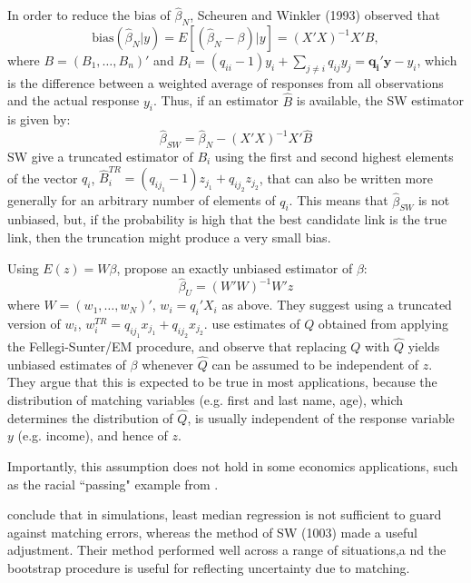 \documentclass[12pt]{article}
\begin{document}
In order to reduce the bias of $\hat{\beta}_N$, Scheuren and Winkler (1993) %
observed that 
$$\text{bias} (\hat{\beta}_N | y) = E[(\hat{\beta}_N - \beta) | y ] = (X'X)^{-1} X'B,$$ 
where $B = (B_1, \dots, B_n)'$ and $B_i = (q_{ii}-1)y_i + \sum_{j\neq i } q_{ij} y_j = \mathbf{q_i'y} - y_i$, which is the difference between a weighted average of responses from all observations and the actual response $y_i$.  Thus, if an estimator $\hat{B}$ is available, the SW estimator is given by:
$$ \hat{\beta}_{SW} = \hat{\beta}_N - (X'X)^{-1} X' \hat{B}$$ 
SW give a truncated estimator of $B_i$ using the first and second highest elements of the vector $q_i$, $\hat{B}_i^{TR} = (q_{ij_1} - 1) z_{j_1} + q_{ij_2} z_{j_2}$, that can also be written more generally for an arbitrary number of elements of $q_i$.  This means that $\hat{\beta}_{SW}$ is not unbiased, but, if the probability is high that the best candidate link is the true link, then the truncation might produce a very small bias. 

Using $E(z) = W\beta$, \cite{lahiri05} propose an exactly unbiased estimator of $\beta$:
$$ \hat{\beta}_U = (W'W)^{-1} W'z$$ 
where $W = (w_1, \dots, w_N)'$, $w_i = q_i'X_i$ as above.  They suggest using a truncated version of $w_i$, $w_i^{TR} = q_{ij_1} x_{j_1} + q_{ij_2} x_{j_2}$.   \cite{lahiri05} use estimates of $Q$ obtained from applying the Fellegi-Sunter/EM procedure, and observe that replacing $Q$ with $\hat{Q}$ yields unbiased estimates of $\beta$ whenever $\hat{Q}$ can be assumed to be independent of $z$.  They argue that this is expected to be true in most applications, because the distribution of matching variables (e.g. first and last name, age), which determines the distribution of $\hat{Q}$, is usually independent of the response variable $y$ (e.g. income), and hence of $z$.  

Importantly, this assumption does not hold in some economics applications, such as the racial ``passing" example from \cite{nq2015}. 

\cite{lahiri05} conclude that in simulations, least median regression is not sufficient to guard against matching errors, whereas the method of SW (1003) made a useful adjustment.  Their method performed well across a range of situations,a nd the bootstrap procedure is useful for reflecting uncertainty due to matching.  


\subsection{\cite{Goldstein2012}}
\end{document}
